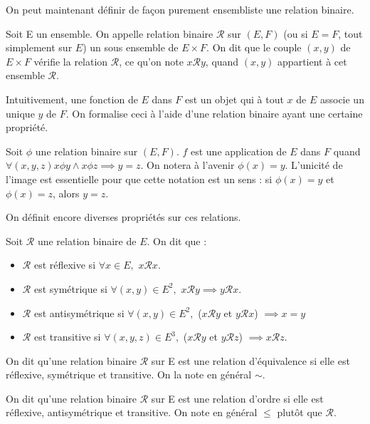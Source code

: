 On peut maintenant définir de façon purement ensembliste une relation binaire. 
\begin{defini}
	Soit E un ensemble. On appelle relation binaire $\mathcal{R}$ sur $(E, F)$ (ou si $E=F$, tout simplement sur $E$) un sous ensemble de $E\times F$. On dit que le couple $(x,y)$ de $E\times F$ vérifie la relation $\mathcal{R}$, ce qu'on note $x\mathcal{R}y$, quand $(x,y)$ appartient à cet ensemble $\mathcal{R}$.
\end{defini}
	
Intuitivement, une fonction de $E$ dans $F$ est un objet qui à tout $x$ de $E$ associe un unique $y$ de $F$. On formalise ceci à l'aide d'une relation binaire ayant une certaine propriété.

\begin{defini}
Soit $\phi$ une relation binaire sur $(E,F)$. $f$ est une application de $E$ dans $F$ quand $\forall(x,y,z)x\phi y \land x\phi z \implies y=z$. On notera à l'avenir $\phi(x)=y$. L'unicité de l'image est essentielle pour que cette notation est un sens : si  $\phi(x)=y$ et  $\phi(x)=z$, alors $y=z$.
\end{defini}

On définit encore diverses propriétés sur ces relations. 

	\begin{defini}
	Soit $\mathcal{R}$ une relation binaire de $E$. On dit que :
	\begin{itemize}
		\item $\mathcal{R}$ est réflexive si $\forall x\in E,$ $x\mathcal{R}x$.
		\item $\mathcal{R}$ est symétrique si $\forall (x,y)\in E^2,$ $x\mathcal{R}y\implies y\mathcal{R}x$.
		\item $\mathcal{R}$ est antisymétrique si $\forall (x,y)\in E^2,$ ($x\mathcal{R}y$ et $y\mathcal{R}x$) $\implies x=y$
		\item $\mathcal{R}$ est transitive si $\forall (x,y,z)\in E^3,$ ($x\mathcal{R}y$ et $y\mathcal{R}z$) $\implies x\mathcal{R}z$.
	\end{itemize}
\end{defini}
	\begin{defini}
	On dit qu'une relation binaire $\mathcal{R}$ sur E est une relation d'équivalence si elle est réflexive, symétrique et transitive. On la note en général $\sim$.
    \end{defini}
	\begin{defini}
	On dit qu'une relation binaire $\mathcal{R}$ sur E est une relation d'ordre si elle est réflexive, antisymétrique et transitive. On note en général $\leq$ plutôt que $\mathcal{R}$.
    \end{defini}

